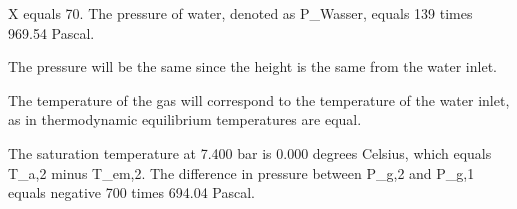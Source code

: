 X equals 70.
The pressure of water, denoted as P_Wasser, equals 139 times 969.54 Pascal.

The pressure will be the same since the height is the same from the water inlet.

The temperature of the gas will correspond to the temperature of the water inlet, as in thermodynamic equilibrium temperatures are equal.

The saturation temperature at 7.400 bar is 0.000 degrees Celsius, which equals T_a,2 minus T_em,2.
The difference in pressure between P_g,2 and P_g,1 equals negative 700 times 694.04 Pascal.